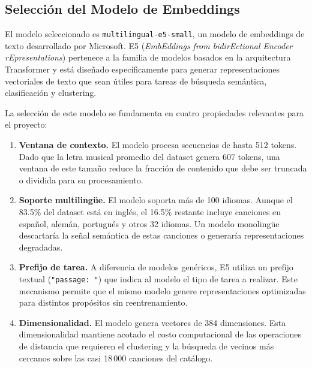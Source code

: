 \subsection{Selección del Modelo de Embeddings}
\label{subsec:seleccion-modelo}

El modelo seleccionado es \texttt{multilingual-e5-small}, un modelo de embeddings de texto desarrollado por Microsoft. E5 (\textit{EmbEddings from bidirEctional Encoder rEpresentations}) pertenece a la familia de modelos basados en la arquitectura Transformer y está diseñado específicamente para generar representaciones vectoriales de texto que sean útiles para tareas de búsqueda semántica, clasificación y clustering.

La selección de este modelo se fundamenta en cuatro propiedades relevantes para el proyecto:

\begin{enumerate}[leftmargin=2em]
    \item \textbf{Ventana de contexto.} El modelo procesa secuencias de hasta 512 tokens. Dado que la letra musical promedio del dataset genera 607 tokens, una ventana de este tamaño reduce la fracción de contenido que debe ser truncada o dividida para su procesamiento.

    \item \textbf{Soporte multilingüe.} El modelo soporta más de 100 idiomas. Aunque el 83.5\% del dataset está en inglés, el 16.5\% restante incluye canciones en español, alemán, portugués y otros 32 idiomas. Un modelo monolingüe descartaría la señal semántica de estas canciones o generaría representaciones degradadas.

    \item \textbf{Prefijo de tarea.} A diferencia de modelos genéricos, E5 utiliza un prefijo textual (\texttt{"passage: "}) que indica al modelo el tipo de tarea a realizar. Este mecanismo permite que el mismo modelo genere representaciones optimizadas para distintos propósitos sin reentrenamiento.

    \item \textbf{Dimensionalidad.} El modelo genera vectores de 384 dimensiones. Esta dimensionalidad mantiene acotado el costo computacional de las operaciones de distancia que requieren el clustering y la búsqueda de vecinos más cercanos sobre las casi 18\,000 canciones del catálogo.
\end{enumerate}


